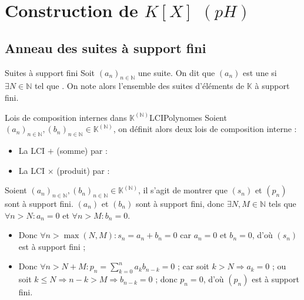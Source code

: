 \documentclass[12pt,a4paper]{report}
\begin{document}
\section{Construction de $K[X]$ $(pH)$}

    \subsection{Anneau des suites à support fini}

    \begin{definition}{Suites à support fini}{}
    Soit $(a_n)_{n \in \mathbb{N}}$ une suite. On dit que $(a_n)$ est une  si $\exists N \in \mathbb{N}$ tel que . On note alors  l'ensemble des suites d'éléments de $\mathbb{K}$ à support fini.
    \end{definition}
    
    \begin{proposition}{Lois de composition internes dans $\mathbb{K}^{(\mathbb{N})}$}{LCIPolynomes}
    Soient $(a_n)_{n \in \mathbb{N}}, (b_n)_{n \in \mathbb{N}} \in \mathbb{K}^{(\mathbb{N})}$, on définit alors deux lois de composition interne :
    \begin{itemize}
        \item La LCI $+$ (somme) par : 
        \item La LCI $\times$ (produit) par : 
    \end{itemize}
    \end{proposition}
    
    
    \begin{demo}
    Soient $(a_n)_{n \in \mathbb{N}}, (b_n)_{n \in \mathbb{N}} \in \mathbb{K}^{(\mathbb{N})}$, il s'agit de montrer que $(s_n)$ et $(p_n)$ sont à support fini. $(a_n)$ et $(b_n)$ sont à support fini, donc $\exists N, M \in \mathbb{N}$ tels que $\forall n > N : a_n = 0$ et $\forall n > M : b_n = 0$.
    \begin{itemize}
        \item Donc $\forall n > \max(N, M) : s_n = a_n + b_n = 0$ car $a_n = 0$ et $b_n = 0$, d'où $(s_n)$ est à support fini ;
        \item Donc $\displaystyle \forall n > N + M : p_n = \sum_{k = 0}^n a_k b_{n-k} = 0$ ; car soit $k > N \Rightarrow a_k = 0$ ; ou soit $k \leqslant N \Rightarrow n-k > M \Rightarrow b_{n-k} = 0$ ; donc $p_n = 0$, d'où $(p_n)$ est à support fini.
    \end{itemize}
    \end{demo}
\end{document}
